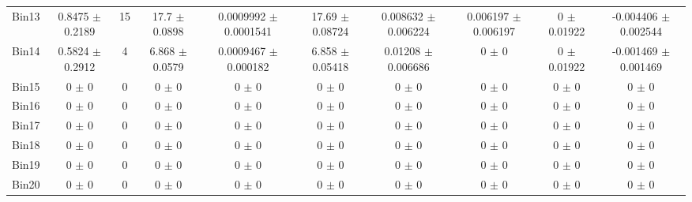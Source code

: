 \begin{tabular}{@{\extracolsep{4pt}}lccccccccc@{}}
     Bin13 & 0.8475 $\pm$ 0.2189 & 15 & 17.7 $\pm$ 0.0898 & 0.0009992 $\pm$ 0.0001541 & 17.69 $\pm$ 0.08724 & 0.008632 $\pm$ 0.006224 & 0.006197 $\pm$ 0.006197 & 0 $\pm$ 0.01922 & -0.004406 $\pm$ 0.002544 \\ 
     Bin14 & 0.5824 $\pm$ 0.2912 & 4 & 6.868 $\pm$ 0.0579 & 0.0009467 $\pm$ 0.000182 & 6.858 $\pm$ 0.05418 & 0.01208 $\pm$ 0.006686 & 0 $\pm$ 0 & 0 $\pm$ 0.01922 & -0.001469 $\pm$ 0.001469 \\ 
     Bin15 & 0 $\pm$ 0 & 0 & 0 $\pm$ 0 & 0 $\pm$ 0 & 0 $\pm$ 0 & 0 $\pm$ 0 & 0 $\pm$ 0 & 0 $\pm$ 0 & 0 $\pm$ 0 \\ 
     Bin16 & 0 $\pm$ 0 & 0 & 0 $\pm$ 0 & 0 $\pm$ 0 & 0 $\pm$ 0 & 0 $\pm$ 0 & 0 $\pm$ 0 & 0 $\pm$ 0 & 0 $\pm$ 0 \\ 
     Bin17 & 0 $\pm$ 0 & 0 & 0 $\pm$ 0 & 0 $\pm$ 0 & 0 $\pm$ 0 & 0 $\pm$ 0 & 0 $\pm$ 0 & 0 $\pm$ 0 & 0 $\pm$ 0 \\ 
     Bin18 & 0 $\pm$ 0 & 0 & 0 $\pm$ 0 & 0 $\pm$ 0 & 0 $\pm$ 0 & 0 $\pm$ 0 & 0 $\pm$ 0 & 0 $\pm$ 0 & 0 $\pm$ 0 \\ 
     Bin19 & 0 $\pm$ 0 & 0 & 0 $\pm$ 0 & 0 $\pm$ 0 & 0 $\pm$ 0 & 0 $\pm$ 0 & 0 $\pm$ 0 & 0 $\pm$ 0 & 0 $\pm$ 0 \\ 
     Bin20 & 0 $\pm$ 0 & 0 & 0 $\pm$ 0 & 0 $\pm$ 0 & 0 $\pm$ 0 & 0 $\pm$ 0 & 0 $\pm$ 0 & 0 $\pm$ 0 & 0 $\pm$ 0 \\ 
\hline\hline
  \end{tabular}
